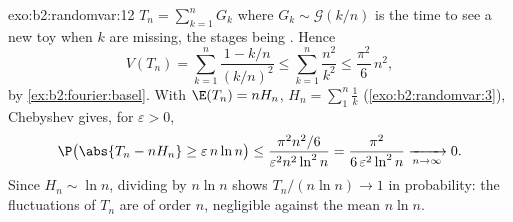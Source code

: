 \begin{solution}{exo:b2:randomvar:12}
$T_n = \sum_{k=1}^nG_k$ where $G_k \sim \mathcal G(k/n)$ is
the time to see a new toy when $k$ are missing, the stages
being . Hence
\[
V(T_n) = \sum_{k=1}^n\frac{1 - k/n}{(k/n)^2}
\leq \sum_{k=1}^n\frac{n^2}{k^2}
\leq \frac{\pi^2}6\,n^2 ,
\]
by \cref{ex:b2:fourier:basel}. With $\E(T_n) = nH_n$, $H_n =
\sum_1^n\frac1k$ (\cref{exo:b2:randomvar:3}), Chebyshev gives,
for $\varepsilon > 0$,
\[
\P\bigl(\abs{T_n - nH_n} \geq \varepsilon\,n\ln n\bigr)
\leq \frac{\pi^2n^2/6}{\varepsilon^2n^2\ln^2 n}
= \frac{\pi^2}{6\,\varepsilon^2\ln^2n}
\xrightarrow[n\to\infty]{} 0 .
\]
Since $H_n \sim \ln n$, dividing by $n\ln n$ shows
$T_n/(n\ln n) \to 1$ in probability: the fluctuations of
$T_n$ are of order $n$, negligible against the mean $n\ln n$.
\end{solution}

